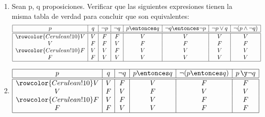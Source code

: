 \begin{enumerate}[label=\roman*)]
  \item
        Sean p, q proposiciones. Verificar que las siguientes expresiones tienen la misma tabla de verdad para
        concluir que son equivalentes:
        \[
          \begin{array}{|c|c|c|c|c|c|c|c|}
            \hline
            p & q & \neg p & \neg q & p \entonces q & \neg q \entonces \neg p & \neg p \lor q & \neg(p \land \neg q) \\ \hline  \hline\rowcolor{Cerulean!10}
            V & V & F      & F      & V             & V                       & V             & V                    \\
            V & F & F      & V      & F             & F                       & F             & F                    \\\rowcolor{Cerulean!10}
            F & V & V      & F      & V             & V                       & V             & V                    \\
            F & F & V      & V      & V             & V                       & V             & V                    \\
            \hline
          \end{array}
        \]
  \item
        \[
          \begin{array}{|c|c|c|c|c|c|}
            \hline
            p & q & \neg q & p \entonces q & \neg (p \entonces q) & p\, \y \neg q \\ \hline  \hline\rowcolor{Cerulean!10}
            V & V & F      & V             & F                    & F             \\
            V & F & V      & F             & V                    & V             \\\rowcolor{Cerulean!10}
            F & V & F      & V             & F                    & F             \\
            F & F & V      & V             & F                    & F             \\ \hline
          \end{array}
        \]
\end{enumerate}
